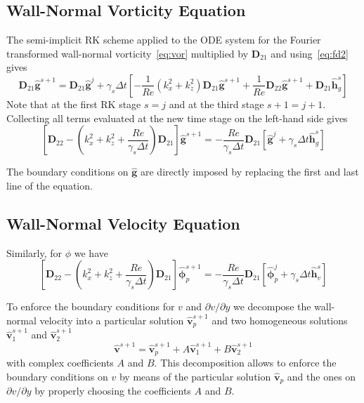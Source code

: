 \documentclass[titlepage,12pt,letter]{article}
\newcommand{\bracket}[1]{\left[ #1 \right]}
\newcommand{\re}{Re}
\numberwithin{equation}{section}
\begin{document}
\subsection{Wall-Normal Vorticity Equation}
The semi-implicit RK scheme applied to the ODE system for the Fourier transformed wall-normal vorticity~\eqref{eq:vor} multiplied by $\bm{D}_{21}$ and using~\eqref{eq:fd2} gives
\begin{equation*}
	\bm{D}_{21} \hat{\bm{g}}^{s+1}=\bm{D}_{21} \hat{\bm{g}}^{j}+\gamma_{s} \Delta t \bracket{ -\frac{1}{\re}\left(k_x^{2}+k_z^{2}\right) \bm{D}_{21} \hat{\bm{g}}^{s+1}+\frac{1}{\re} \bm{D}_{22} \hat{\bm{g}}^{s+1}+\bm{D}_{21} \hat{\bm{h}}_{g}^{s} }
\end{equation*}
Note that at the first RK stage $s=j$ and at the third stage $s+1=j+1$. Collecting all terms evaluated at the new time stage on the left-hand side gives
\begin{equation}
	\bracket{\bm{D}_{22}-\left(k_x^{2}+k_z^{2}+\frac{\re}{\gamma_{s} \Delta t}\right) \bm{D}_{21}} \hat{\bm{g}}^{s+1}=-\frac{\re}{\gamma_{s} \Delta t} \bm{D}_{21} \bracket{ \hat{\bm{g}}^{j}+\gamma_{s} \Delta t \hat{\bm{h}}_{g}^{s} } \label{eq:ome}
\end{equation}

The boundary conditions on $\hat{\bm{g}}$ are directly imposed by replacing the first and last line of the equation.

\subsection{Wall-Normal Velocity Equation}
Similarly, for $\phi$ we have
\begin{equation}
	\bracket{\bm{D}_{22}-\left(k_x^{2}+k_z^{2}+\frac{\re}{\gamma_{s} \Delta t}\right) \bm{D}_{21}} \hat{\bm{\phi}}_p^{s+1}=-\frac{\re}{\gamma_{s} \Delta t} \bm{D}_{21} \bracket{ \hat{\bm{\phi}}_p^{j}+\gamma_{s} \Delta t \hat{\bm{h}}_{v}^{s} } \label{eq:phip}
\end{equation}

To enforce the boundary conditions for $v$ and $\partial v / \partial y$ we decompose the wall-normal velocity into a particular solution $\hat{\bm{v}}_{p}^{s+1}$ and two homogeneous solutions $\hat{\bm{v}}_{1}^{s+1}$ and $\hat{\bm{v}}_{2}^{s+1}$
\begin{equation*}
\hat{\bm{v}}^{s+1}=\hat{\bm{v}}_{p}^{s+1}+A \hat{\bm{v}}_{1}^{s+1}+B \hat{\bm{v}}_{2}^{s+1}
\end{equation*}
with complex coefficients $A$ and $B$. This decomposition allows to enforce the boundary conditions on $v$ by means of the particular solution $\hat{\bm{v}}_{p}$ and the ones on $\partial v / \partial y$ by properly choosing the coefficients $A$ and $B$. 
\end{document}
